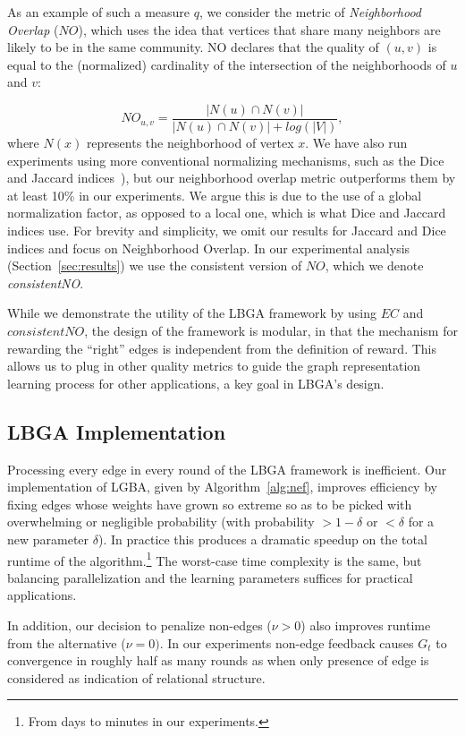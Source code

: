 \documentclass{article}
\begin{document}
As an example of such a measure $q$, we consider the metric of
\emph{Neighborhood Overlap} ($NO$), which uses the idea that vertices that
share many neighbors are likely to be in the same community. NO declares that
the quality of $(u,v)$ is equal to the (normalized) cardinality of the
intersection of the neighborhoods of $u$ and $v$: 

\[ 
   NO_{u,v}=\frac{|N(u) \cap N(v)|}{|N(u) \cap N(v)| + log(|V|)}, 
\] 
where $N(x)$ represents the neighborhood of vertex $x$. We have also run
experiments using more conventional normalizing mechanisms, such as the Dice
and Jaccard indices~\cite{Dice1945,Jaccard1912}), but our neighborhood overlap
metric outperforms them by at least 10\% in our experiments. We argue this is
due to the use of a global normalization factor, as opposed to a local one,
which is what Dice and Jaccard indices use. %
For brevity and simplicity, we omit our results for Jaccard and Dice indices and
focus on Neighborhood Overlap. In our experimental analysis
(Section~\ref{sec:results}) we use the consistent version of $NO$, which we
denote \emph{consistentNO}. 

While we demonstrate the utility of the LBGA framework by using $EC$ and
$consistentNO$, the design of the framework is modular, in that the mechanism
for rewarding the ``right'' edges is independent from the definition of reward.
This allows us to plug in other quality metrics to guide the graph
representation learning process for other applications, a key goal in LBGA's
design.


\subsection{LBGA Implementation} 
Processing every edge in every round of the LBGA framework is inefficient.
Our implementation of LGBA, given by Algorithm~\ref{alg:nef}, improves
efficiency by fixing edges whose weights have grown so extreme so as to be
picked with overwhelming or negligible probability (with probability $ >
1-\delta$ or $< \delta$ for a new parameter $\delta$). In practice this
produces a dramatic speedup on the total runtime of the
algorithm.\footnote{From days to minutes in our experiments.} The worst-case
time complexity is the same, but balancing parallelization and the learning
parameters suffices for practical applications. 

In addition, our decision to penalize non-edges ($\nu > 0$) also improves
runtime from the alternative ($\nu = 0)$. In our experiments non-edge feedback
causes $G_t$ to convergence in roughly half as many rounds as when only
presence of edge is considered as indication of relational structure.
\end{document}
